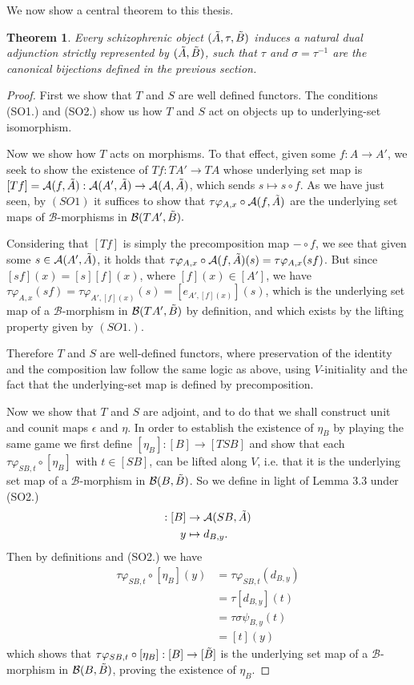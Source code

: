 \documentclass[12pt,a4paper]{article}
\newtheorem{theorem}{Theorem}[section] %
\def\HomA{\ensuremath\mathcal{A}}
\def\HomB{\ensuremath\mathcal{B}}
\def\t{\ensuremath\tilde}
\begin{document}
We now show a central theorem to this thesis.

\begin{theorem}
	Every schizophrenic object $(\t A, \tau , \t B)$ induces a natural dual adjunction strictly represented by $(\t A, \t B)$, such that $\tau$ and $\sigma = \tau^{-1}$ are the canonical bijections defined in the previous section.
\end{theorem}
\begin{proof}
	First we show that $T$ and $S$ are well defined functors. The conditions (SO1.) and (SO2.) show us how $T$ and $S$ act on objects up to underlying-set isomorphism. 
	
	Now we show how $T$ acts on morphisms. To that effect, given some $f: A \to A'$, we seek to show the existence of $Tf: TA' \to TA$ whose underlying set map is $[Tf] = \HomA(f, \t A): \HomA(A', \t A) \to \HomA(A, \t A)$, which sends $s \mapsto s \circ f$. As we have just seen, by $(SO1)$ it suffices to show that $\tau \varphi_{A,x}\circ \HomA(f, \t A)$ are the underlying set maps of  $\mathcal{B}$-morphisms in $\HomB(TA', \t B).$
	
	Considering that $[Tf]$ is simply the precomposition map $- \circ f$, we see that given some $s \in \HomA(A', \t A)$, it holds that $\tau \varphi_{A,x}\circ \HomA(f, \t A)(s) =\tau \varphi_{A,x}(sf)$. But since $[sf](x) = [s][f](x)$, where $[f](x) \in [A']$, we have $\tau \varphi_{A,x}(sf) = \tau \varphi_{A',[f](x)}(s) = [e_{A',[f](x)}](s)$, which is the underlying set map of a $\mathcal{B}$-morphism in $\HomB(TA', \t B)$ by definition, and which exists by the lifting property given by $(SO1.)$. 
	
	Therefore $T$ and $S$ are well-defined functors, where preservation of the identity and the composition law follow the same logic as above, using $V$-initiality and the fact that the underlying-set map is defined by precomposition.
	
	Now we show that $T$ and $S$ are adjoint, and to do that we shall construct  unit and counit maps $\epsilon$ and $\eta$. In order to establish the existence of $\eta_B$ by playing the same game we first define $[\eta_B]: [B] \to [TSB]$ and show that each $\tau \varphi_{SB, t} \circ [\eta_B]$ with $t \in [SB]$, can be lifted along $V$, i.e. that it is the underlying set map of a $\mathcal{B}$-morphism in $\HomB(B, \t B)$. So we define in light of Lemma 3.3 under (SO2.)
	\begin{align*}
		[\eta_B]:[B] &\to \HomA(SB, \t A)\\
		y &\mapsto d_{B,y}.
	\end{align*}
Then by definitions and (SO2.) we have  \begin{align*}
	\tau \varphi_{SB, t} \circ [\eta_B](y) &= \tau \varphi_{SB, t} (d_{B,y})\\ &= \tau [d_{B,y}](t)\\ &= \tau \sigma \psi_{B,y}(t)\\ &= [t](y)
\end{align*}
which shows that $\tau \varphi_{SB, t} \circ [\eta_B]: [B] \to [\t B]$ is the underlying set map of a $\mathcal{B}$-morphism in $\HomB(B, \t B)$, proving the existence of $\eta_B$. 


\end{proof}
\end{document}
